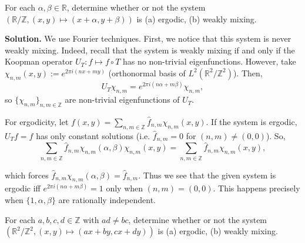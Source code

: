 \documentclass{template}
\begin{document}
\begin{problem}[Exercise 2]
    For each $\alpha,\beta \in \mathbb{R}$, determine whether or not the system 
    $(\mathbb{R}/\mathbb{Z}, (x,y) \mapsto (x+\alpha,y+\beta))$ is (a) ergodic, 
    (b) weakly mixing.
\end{problem}

\textbf{Solution.} We use Fourier techniques. First, we notice that this system
is never weakly mixing. Indeed, recall that the system is weakly mixing if and
only if the Koopman operator $U_T: f \mapsto f \circ T$ has no non-trivial
eigenfunctions. However, take $\chi_{n,m}(x,y) := e^{2\pi i(nx+my)}$
(orthonormal basis of $L^2(\mathbb{R}^2/\mathbb{Z}^2)$). Then,
\begin{equation*}
    U_T\chi_{n,m} = e^{2\pi i (n\alpha+m\beta)}\chi_{n,m},
\end{equation*}
so $\{\chi_{n,m}\}_{n,m \in \mathbb{Z}}$ are non-trivial eigenfunctions of $U_T$.

For ergodicity, let $f(x,y) = \sum_{n,m \in \mathbb{Z}}
\widehat{f}_{n,m}\chi_{n,m}(x,y)$. If the system is ergodic, $U_Tf = f$ has only
constant solutions (i.e. $\widehat{f}_{n,m}=0$ for $(n,m) \neq (0,0)$). So,
\begin{equation*}
    \sum_{n,m \in \mathbb{Z}}\widehat{f}_{n,m}\chi_{n,m}(\alpha,\beta)\chi_{n,m}(x,y) = \sum_{n,m \in \mathbb{Z}} \widehat{f}_{n,m}\chi_{n,m}(x,y),
\end{equation*}

which forces $\widehat{f}_{n,m}\chi_{n,m}(\alpha,\beta) = \widehat{f}_{n,m}$.
Thus we see that the given system is ergodic iff $e^{2\pi i (n\alpha +
m\beta)}=1$ only when $(n,m)=(0,0)$. This happens precisely when
$\{1,\alpha,\beta\}$ are rationally independent.

\begin{problem}[Exercise 3]
    For each $a,b,c,d \in \mathbb{Z}$ with $ad \neq bc$, determine whether or not 
    the system $(\mathbb{R}^2/\mathbb{Z}^2, (x,y) \mapsto (ax+by,cx+dy))$ is (a) ergodic,
    (b) weakly mixing.
\end{problem}
\end{document}
